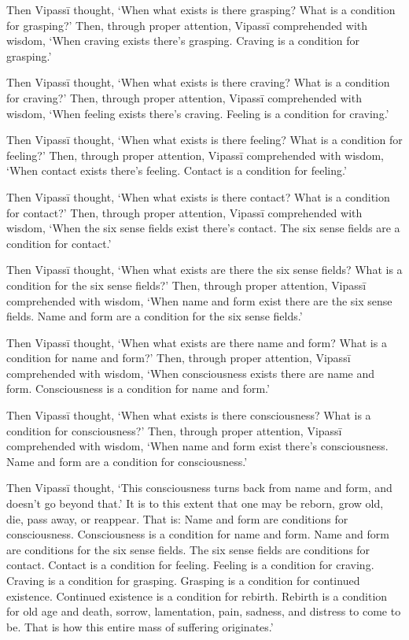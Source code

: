 \documentclass[12pt,openany]{book}%
\begin{document}
Then \textsanskrit{Vipassī} thought, ‘When what exists is there grasping? What is a condition for grasping?’ Then, through proper attention, \textsanskrit{Vipassī} comprehended with wisdom, ‘When craving exists there’s grasping. Craving is a condition for grasping.’ 

Then \textsanskrit{Vipassī} thought, ‘When what exists is there craving? What is a condition for craving?’ Then, through proper attention, \textsanskrit{Vipassī} comprehended with wisdom, ‘When feeling exists there’s craving. Feeling is a condition for craving.’ 

Then \textsanskrit{Vipassī} thought, ‘When what exists is there feeling? What is a condition for feeling?’ Then, through proper attention, \textsanskrit{Vipassī} comprehended with wisdom, ‘When contact exists there’s feeling. Contact is a condition for feeling.’ 

Then \textsanskrit{Vipassī} thought, ‘When what exists is there contact? What is a condition for contact?’ Then, through proper attention, \textsanskrit{Vipassī} comprehended with wisdom, ‘When the six sense fields exist there’s contact. The six sense fields are a condition for contact.’ 

Then \textsanskrit{Vipassī} thought, ‘When what exists are there the six sense fields? What is a condition for the six sense fields?’ Then, through proper attention, \textsanskrit{Vipassī} comprehended with wisdom, ‘When name and form exist there are the six sense fields. Name and form are a condition for the six sense fields.’ 

Then \textsanskrit{Vipassī} thought, ‘When what exists are there name and form? What is a condition for name and form?’ Then, through proper attention, \textsanskrit{Vipassī} comprehended with wisdom, ‘When consciousness exists there are name and form. Consciousness is a condition for name and form.’ 

Then \textsanskrit{Vipassī} thought, ‘When what exists is there consciousness? What is a condition for consciousness?’ Then, through proper attention, \textsanskrit{Vipassī} comprehended with wisdom, ‘When name and form exist there’s consciousness. Name and form are a condition for consciousness.’ 

Then \textsanskrit{Vipassī} thought, ‘This consciousness turns back from name and form, and doesn’t go beyond that.’ It is to this extent that one may be reborn, grow old, die, pass away, or reappear. That is: Name and form are conditions for consciousness. Consciousness is a condition for name and form. Name and form are conditions for the six sense fields. The six sense fields are conditions for contact. Contact is a condition for feeling. Feeling is a condition for craving. Craving is a condition for grasping. Grasping is a condition for continued existence. Continued existence is a condition for rebirth. Rebirth is a condition for old age and death, sorrow, lamentation, pain, sadness, and distress to come to be. That is how this entire mass of suffering originates.’ 
\end{document}
